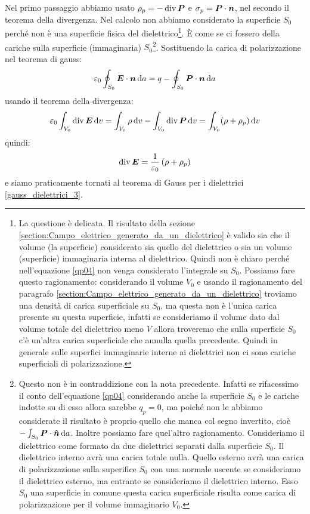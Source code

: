 Nel primo passaggio abbiamo usato $\rho_p=-\operatorname{div}\boldsymbol{P}$ e $\sigma_p=\boldsymbol{P}\cdot\boldsymbol{n}$, nel secondo il teorema della divergenza. Nel calcolo non abbiamo considerato la superficie $S_0$ perché non è una superficie fisica del dielettrico\footnote{La questione è delicata. Il risultato della sezione \ref{section:Campo_elettrico_generato_da_un_dielettrico} è valido sia che il volume (la superficie) considerato sia quello del dielettrico o sia un volume (superficie) immaginaria interna al dielettrico. Quindi non è chiaro perché nell'equazione \eqref{qp04} non venga considerato l'integrale su $S_0$. Possiamo fare questo ragionamento: considerando il volume $V_0$ e usando il ragionamento del paragrafo \ref{section:Campo_elettrico_generato_da_un_dielettrico} troviamo una densità di carica superficiale su $S_0$, ma questa non è l'unica carica presente su questa superficie, infatti se consideriamo il volume dato dal volume totale del dielettrico meno $V$ allora troveremo che sulla superficie $S_0$ c'è un'altra carica superficiale che annulla quella precedente. Quindi in generale sulle superfici immaginarie interne ai dielettrici non ci sono cariche superficiali di polarizzazione.}. È come se ci fossero della cariche sulla superficie (immaginaria) $S_0$\footnote{Questo non è in contraddizione con la nota precedente. Infatti se rifacessimo il conto dell'equazione \eqref{qp04} considerando anche la superficie $S_0$ e le cariche indotte su di esso allora sarebbe $q_p=0$, ma poiché non le abbiamo considerate il risultato è proprio quello che manca col segno invertito, cioè $-\int_{S_0}\boldsymbol{P}\cdot\boldsymbol{\hat {n}}\,\mathrm{d}  a$. Inoltre possiamo fare quel'altro ragionamento. Consideriamo il dielettrico come formato da due dielettrici separati dalla superficie $S_0$. Il dielettrico interno avrà una carica totale nulla. Quello esterno avrà una carica di polarizzazione sulla superifice $S_0$ con una normale uscente se consideriamo il dielettrico esterno, ma entrante se consideriamo il dielettrico interno. Esso $S_0$ una superficie in comune questa carica superficiale risulta come carica di polarizzazione per il volume immaginario $V_0$.}. Sostituendo la carica di polarizzazione nel teorema di gauss:
\begin{equation}
  \varepsilon_0\oint_{S_0}\boldsymbol{E}\cdot\boldsymbol{n}\,\mathrm{d} a=q-\oint_{S_0}\boldsymbol{P}\cdot\boldsymbol{n}\,\mathrm{d} a
\end{equation}
usando il teorema della divergenza:
\begin{equation}
  \varepsilon_0\int_{V_0}\operatorname{div}\boldsymbol{E}\,\mathrm{d} v=\int_{V_0}\rho\,\mathrm{d} v-\int_{V_0}\operatorname{div}\boldsymbol{P}\,\mathrm{d} v=\int_{V_0}(\rho+\rho_p)\,\mathrm{d} v
\end{equation}
quindi:
\begin{equation}
  \operatorname{div}\boldsymbol{E}=\frac{1}{\varepsilon_0}\left(\rho+\rho_p\right)
\end{equation}
e siamo praticamente tornati al teorema di Gauss per i dielettrici \eqref{gauss_dielettrici_3}.
